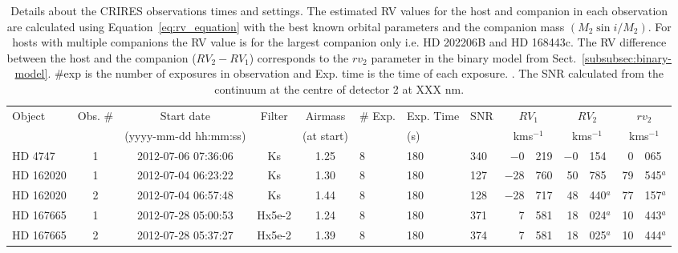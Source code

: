 
\begin{table*}
           \centering    
            \caption{Details about the CRIRES observations times and settings. {\rd The estimated RV values for the host and companion in each observation are calculated using Equation~\ref{eq:rv_equation} with the best known orbital parameters and the companion mass \((M_{2}\sin{i}/M_{2})\)}. For hosts with multiple companions the RV value is for the largest companion only i.e. {HD 202206}B and {HD 168443}c. The RV difference between the host and the companion (\(RV_2 - RV_1\)) corresponds to the \(rv_2\) parameter in the binary model from Sect.~\ref{subsubsec:binary-model}. {\rd #exp is the number of exposures in observation and Exp. time is the time of each exposure. . The SNR calculated from the continuum at the centre of detector 2 at XXX nm.}}
            \begin{tabular}{l c c c clll r@{.}l r@{.}l r@{.}l}
                \toprule
                Object & Obs. \# & Start date  & Filter & Airmass  & \# Exp. & Exp. Time & SNR & \multicolumn{2}{c}{\(RV_1\)} & \multicolumn{2}{c}{\(RV_2\)} & \multicolumn{2}{c}{\(rv_2\)}  \\  %
                &   & (yyyy-mm-dd hh:mm:ss)  &  & (at start) & & (s) & & \multicolumn{2}{c}{kms\(^{-1}\)} & \multicolumn{2}{c}{kms\(^{-1}\)} & \multicolumn{2}{c}{kms\(^{-1}\)}\\ %
                \midrule
                {HD 4747}   & 1 & 2012-07-06 07:36:06 & Ks     	      & 1.25  	  &8 &180 & 340 & $-$0    & 219 & $-$0  & 154 & 0&065 \\ %
                {HD 162020} & 1 & 2012-07-04 06:23:22 & Ks     		& 1.30 		& 8&180 & 127 & $-$28  & 760 & 50 & 785\tnote{a}  & 79&545$^a$ \\ %
                {HD 162020} & 2 & 2012-07-04 06:57:48 & Ks     		& 1.44  	& 8&180 & 128 & $-$28  & 717 & 48 & 440$^a$ & 77&157$^a$ \\ %
                {HD 167665} & 1 & 2012-07-28 05:00:53 & Hx5e-2 	& 1.24 		& 8&180 & 371 & 7         & 581 & 18 & 024$^a$ & 10&443$^a$ \\ %
                {HD 167665} & 2 & 2012-07-28 05:37:27 & Hx5e-2 	& 1.39  	&8 &180 & 374 & 7         & 581 & 18 & 025$^a$  & 10&444$^a$ \\ %

\end{tabular}
\end{table*}
